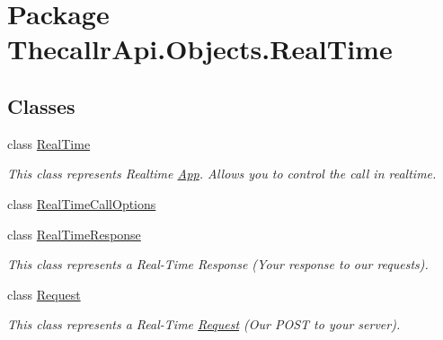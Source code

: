 \hypertarget{namespace_thecallr_api_1_1_objects_1_1_real_time}{\section{Package Thecallr\+Api.\+Objects.\+Real\+Time}
\label{namespace_thecallr_api_1_1_objects_1_1_real_time}
}
\subsection*{Classes}
\begin{DoxyCompactItemize}
\item 
class \hyperlink{class_thecallr_api_1_1_objects_1_1_real_time_1_1_real_time}{Real\+Time}
\begin{DoxyCompactList}\small\item\em This class represents Realtime \hyperlink{namespace_thecallr_api_1_1_objects_1_1_app}{App}. Allows you to control the call in realtime. \end{DoxyCompactList}\item 
class \hyperlink{class_thecallr_api_1_1_objects_1_1_real_time_1_1_real_time_call_options}{Real\+Time\+Call\+Options}
\item 
class \hyperlink{class_thecallr_api_1_1_objects_1_1_real_time_1_1_real_time_response}{Real\+Time\+Response}
\begin{DoxyCompactList}\small\item\em This class represents a Real-\/\+Time Response (Your response to our requests). \end{DoxyCompactList}\item 
class \hyperlink{class_thecallr_api_1_1_objects_1_1_real_time_1_1_request}{Request}
\begin{DoxyCompactList}\small\item\em This class represents a Real-\/\+Time \hyperlink{class_thecallr_api_1_1_objects_1_1_real_time_1_1_request}{Request} (Our P\+O\+S\+T to your server). \end{DoxyCompactList}\end{DoxyCompactItemize}
